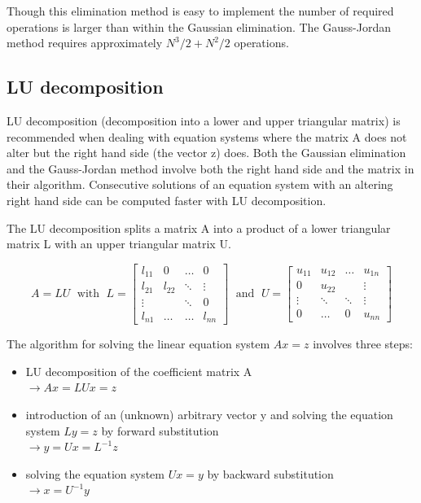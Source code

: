 \addvspace{12pt}

Though this elimination method is easy to implement the number of
required operations is larger than within the Gaussian elimination.
The Gauss-Jordan method requires approximately $N^3/2 + N^2/2$
operations.

\subsection{LU decomposition}

LU decomposition (decomposition into a lower and upper triangular
matrix) is recommended when dealing with equation systems where the
matrix A does not alter but the right hand side (the vector z) does.
Both the Gaussian elimination and the Gauss-Jordan method involve both
the right hand side and the matrix in their algorithm.  Consecutive
solutions of an equation system with an altering right hand side can
be computed faster with LU decomposition.

\addvspace{12pt}

The LU decomposition splits a matrix A into a product of a lower
triangular matrix L with an upper triangular matrix U.

\begin{equation}
A = L U \;\text{ with }\;
L = 
\begin{bmatrix}
l_{11} & 0 & \ldots & 0\\
l_{21} & l_{22} & \ddots & \vdots\\
\vdots &  & \ddots & 0\\
l_{n1} & \ldots & \ldots & l_{nn}
\end{bmatrix}
\;\text{ and }\;
U =
\begin{bmatrix}
u_{11} & u_{12} & \ldots & u_{1n}\\
0 & u_{22} &  & \vdots\\
\vdots & \ddots & \ddots & \vdots\\
0 & \ldots & 0 & u_{nn}
\end{bmatrix}
\end{equation}

The algorithm for solving the linear equation system $Ax = z$ involves
three steps:
\begin{itemize}
\item LU decomposition of the coefficient matrix A\\
$\rightarrow Ax = LUx = z$
\item introduction of an (unknown) arbitrary vector y and solving the equation system $Ly = z$ by forward substitution\\
$\rightarrow y = Ux = L^{-1}z$
\item solving the equation system $Ux = y$  by backward substitution\\
$\rightarrow x = U^{-1}y$
\end{itemize}

